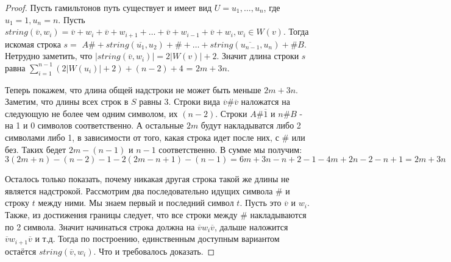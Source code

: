 \documentclass[a4paper,10pt]{article}
\begin{document}
\begin{proof}
Пусть гамильтонов путь существует и имеет вид $U = u_1, \dots, u_n$, где $u_1 = 1, u_n = n$.
Пусть $string(\overline{v}, w_i) = \overline{v} + w_i + \overline{v} + w_{i+1} + \dots + \overline{v} + w_{i-1} + \overline{v} + w_i, w_i \in W(v)$.
Тогда искомая строка $s = $ $A\# + string(\overline{u_1}, u_2) + \# + \dots + string(\overline{u_{n-1}}, u_n) + \# B$.
Нетрудно заметить, что $|string(\overline{v}, w_i)| = 2|W(v)| + 2$. 
Значит длина строки $s$ равна $\sum\limits_{i=1}^{n-1} (2|W(u_i)| + 2) + (n - 2) + 4$ = $2m + 3n$. 

Теперь покажем, что длина общей надстроки не может быть меньше $2m + 3n$.
Заметим, что длины всех строк в $S$ равны 3.
Строки вида $\overline{v} \# \overline{v}$ наложатся на следующую не более чем одним символом, их $(n - 2)$.
Строки $A \# \overline{1}$ и $n\#B$ - на 1 и 0 символов соответственно.
А остальные $2m$ будут накладыватся либо 2 символами либо 1, в зависимости от того, какая строка идет после них, с \# или без.
Таких бедет $2m - (n - 1)$ и $n - 1$ соответственно.
В сумме мы получим:
\[
	3(2m + n) - (n - 2) - 1 - 2(2m - n + 1) - (n - 1) = 6m + 3n - n + 2 - 1 - 4m + 2n - 2 - n + 1 = 2m + 3n
\]

Осталось только показать, почему никакая другая строка такой же длины не является надстрокой.
Рассмотрим два последовательно идущих символа \# и строку $t$ между ними.
Мы знаем первый и последний символ $t$.
Пусть это $\overline{v}$ и $w_i$.
Также, из достижения границы следует, что все строки между \# накладываются по 2 символа.
Значит начинаться строка должна на $\overline{v} w_i \overline{v}$, дальше наложится $\overline{v} w_{i+1} \overline{v}$ и т.д.
Тогда по построению, единственным доступным вариантом остаётся $string(\overline{v}, w_i)$.
Что и требовалось доказать.
\end{proof}
\end{document}
